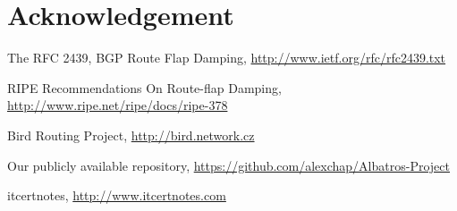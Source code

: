 \documentclass[a4paper,english]{IEEEtran}
\begin{document}
\section{Acknowledgement}
\begin{thebibliography}{5}
The RFC 2439, BGP Route Flap Damping, \href{http://www.ietf.org/rfc/rfc2439.txt}{http://www.ietf.org/rfc/rfc2439.txt}

 RIPE Recommendations On Route-flap
Damping, \href{http://www.ripe.net/ripe/docs/ripe-378}{http://www.ripe.net/ripe/docs/ripe-378}

Bird Routing Project, \href{http://bird.network.cz}{http://bird.network.cz}

Our publicly available repository, \href{https://github.com/alexchap/Albatros-Project}{https://github.com/alexchap/Albatros-Project}

itcertnotes, \href{www.itcertnotes.com}{http://www.itcertnotes.com}
\end{thebibliography}
\end{document}
